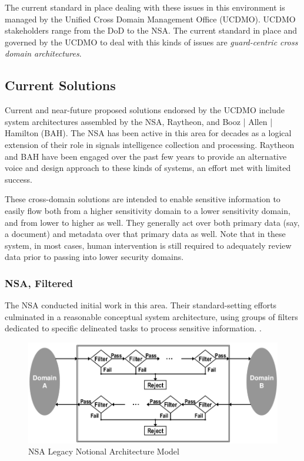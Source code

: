 \documentclass[12pt,letterpaper]{article}
\begin{document}
The current standard in place dealing with these issues in this environment is managed by the Unified Cross Domain Management Office (UCDMO).  UCDMO stakeholders range from the DoD to the NSA.  The current standard in place and governed by the UCDMO to deal with this kinds of issues are \textit{guard-centric cross domain architectures}.

\subsection{Current Solutions}
Current and near-future proposed solutions endorsed by the UCDMO include system architectures assembled by the NSA, Raytheon, and Booz | Allen | Hamilton (BAH).   The NSA has been active in this area for decades as a logical extension of their role in signals intelligence collection and processing.  Raytheon and BAH have been engaged over the past few years to provide an alternative voice and design approach to these kinds of systems, an effort met with limited success.

These cross-domain solutions are intended to enable sensitive information to easily flow both from a higher sensitivity domain to a lower sensitivity domain, and from lower to higher as well.  They generally act over both primary data (say, a document) and metadata over that primary data as well.  Note that in these system, in most cases, human intervention is still required to adequately review data prior to passing into lower security domains.

\subsubsection{NSA, Filtered}
The NSA conducted initial work in this area.  Their standard-setting efforts culminated in a reasonable conceptual system architecture, using groups of filters dedicated to specific delineated tasks to process sensitive information. \cite{proposal:nsa-arch}.

\begin{figure}[!t]
\centering
\includegraphics[width=5in]{nsa-legacy-arch}
\caption{NSA Legacy Notional Architecture Model}
\label{fig:model:conceptual-model}
\end{figure}
\end{document}
